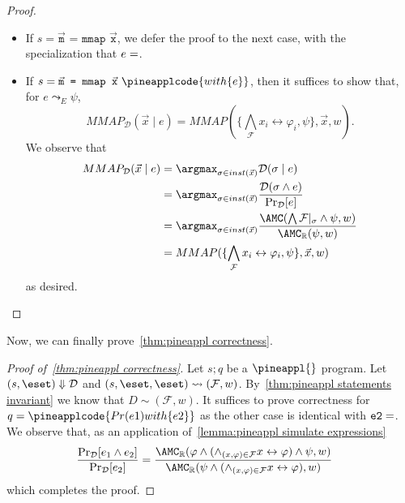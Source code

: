 \begin{proof}
\begin{itemize}[leftmargin=*]
\begin{align}
      \bigwedge_{(x, \varphi) \in \mathcal F} (x \leftrightarrow \varphi)|_{\sigma} \land
        \paren{\paren{\{x_i \leftrightarrow \chi \land \varphi_i\lor \overline \chi \land  \varphi_i \} \mid_{\sigma}}}
    \end{align}
    as desired by repeated usage of~\cref{lemma:inc exc prob,lemma:ind conj prob}.
    \item If $s = \vec{\texttt{m}}\texttt{ = mmap }\vec{\texttt{x}}$,
    we defer the proof to the next case, with the specialization that $e = \tt$.
    \item If $s = \vec{\texttt{m}}\texttt{ = mmap }\vec{\texttt{x}} \ \pineapplcode{ with \{e\}}$,
    then it suffices to show that, for $e \leadsto_E \psi$,
    \begin{equation*}
      MMAP_{\mathcal D} (\vec x \mid e) = MMAP(\{\bigwedge_{\mathcal F} x_i \leftrightarrow \varphi_i, \psi\}, \vec x, w).
    \end{equation*}
    We observe that
    \begin{align}
      MMAP_{\mathcal D} (\vec x \mid e)
      & = \argmax_{\sigma \in inst(\vec x)} \mathcal D (\sigma  \mid e)\\
      & = \argmax_{\sigma \in inst(\vec x)} \frac{\mathcal D (\sigma \land e)}{\Pr_{\mathcal D}[e]}
      \\
      & = \argmax_{\sigma \in inst(\vec x)} \frac{\AMC(\bigwedge \mathcal F |_\sigma \land \psi, w)}{\AMC_{\mathbb R}(\psi, w)}\\
      & = MMAP(\{\bigwedge_{\mathcal F} x_i \leftrightarrow \varphi_i, \psi\},\vec x, w)
    \end{align}
    as desired.
  \end{itemize}
\end{proof}

Now, we can finally prove~\cref{thm:pineappl correctness}.

\begin{proof}[Proof of~\cref{thm:pineappl correctness}]
  Let $s;q$ be a $\pineappl{}$ program.
  Let $(s, \eset) \Downarrow \mathcal D$ and $(s, \eset,\eset) \leadsto (\mathcal F, w)$.
  By~\cref{thm:pineappl statements invariant} we know that $D \sim (\mathcal F, w)$.
  It suffices to prove correctness for $q = \pineapplcode{Pr(e1) with \{e2\}}$ as the other case is identical with $\texttt{e2}  = \tt$.
  We observe that, as an application of~\cref{lemma:pineappl simulate expressions}
  \begin{align}
    \frac{\Pr_{\mathcal D}[e_1 \land e_2]}{\Pr_{\mathcal D}[e_2]}
    &=\frac{\AMC_{\mathbb R}(\varphi \land (\land_{(x, \varphi) \in \mathcal F} x \leftrightarrow \varphi) \land \psi,w)}
      {\AMC_{\mathbb R}(\psi \land (\land_{(x, \varphi) \in \mathcal F} x \leftrightarrow \varphi),w)}
  \end{align}
  which completes the proof.
\end{proof}